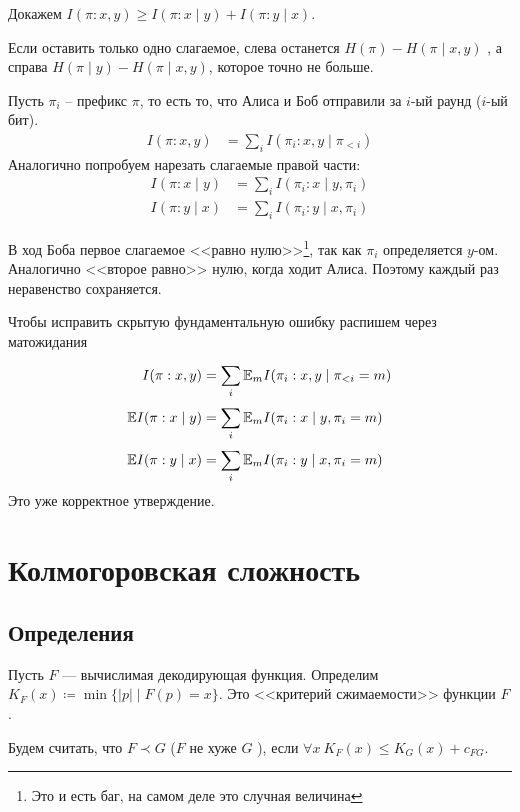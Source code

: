
Докажем $ I( \pi : x, y) \ge I( \pi : x \mid y) + I(\pi : y  \mid x)$. 

Если оставить только одно слагаемое,  слева останется
$ H( \pi ) - H( \pi \mid x, y) $
, а справа 
$ H( \pi \mid y ) - H( \pi \mid x, y) $, которое точно не больше.

Пусть $  \pi_i$ -- префикс $  \pi$, то есть то, что Алиса и Боб отправили за $ i$-ый раунд ($ i$-ый бит).
\begin{align*}
	I( \pi : x, y) &= \sum_{i}^{} I( \pi_i : x, y \mid \pi_{< i}) 
\end{align*}
Аналогично попробуем нарезать слагаемые правой части:
\begin{align*}
	I( \pi : x \mid y) & = \sum_{i}^{} I( \pi_i : x \mid y, \pi_i) \\
	I( \pi : y \mid x) & = \sum_{i}^{} I( \pi_i : y \mid x, \pi_i) 
\end{align*}

В ход Боба первое слагаемое <<равно нулю>>\footnote{Это и есть баг, на самом деле это случная величина}, так как $  \pi_i$ определяется $ y $-ом. Аналогично <<второе равно>> нулю, когда ходит Алиса. Поэтому каждый раз неравенство сохраняется. 

Чтобы исправить скрытую фундаментальную ошибку распишем через матожидания
\begin{align*}
	I( \pi : x, y) &= \sum_{i}^{} \mathbb{E}_{m}I( \pi_i : x, y \mid \pi_{< i} = m) \\
	\mathbb{E} I( \pi : x \mid y) & = \sum_{i}^{} \mathbb{E}_m I( \pi_i : x \mid y, \pi_i = m) \\
	\mathbb{E} I( \pi : y \mid x) & = \sum_{i}^{} \mathbb{E}_mI( \pi_i : y \mid x, \pi_i = m) 
\end{align*}
Это уже корректное утверждение.


\chapter{Колмогоровская сложность}
\section{Определения}

Пусть $ F$ --- вычислимая декодирующая функция.
Определим $ K_F(x) \coloneqq \min \{\lvert p \rvert \mid F(p) = x\}$. Это <<критерий сжимаемости>> функции $ F$.

Будем считать, что $ F \prec G$ ($ F$ не хуже  $ G$ ), если $ \forall x ~ K_F(x) \le K_G(x) + c_{FG}$.

